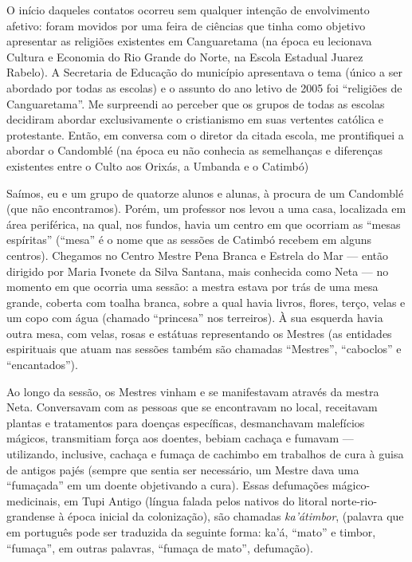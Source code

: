 \begin{refsection}
    O início daqueles contatos ocorreu sem qualquer intenção de envolvimento afetivo: foram movidos por uma feira de ciências que tinha como objetivo apresentar as religiões existentes em Canguaretama (na época eu lecionava Cultura e Economia do Rio Grande do Norte, na Escola Estadual Juarez Rabelo). A Secretaria de Educação do município apresentava o tema (único a ser abordado por todas as escolas) e o assunto do ano letivo de 2005 foi ``religiões de Canguaretama''. Me surpreendi ao perceber que os grupos de todas as escolas decidiram abordar exclusivamente o cristianismo em suas vertentes católica e protestante. Então, em conversa com o diretor da citada escola, me prontifiquei a abordar o Candomblé (na época eu não conhecia as semelhanças e diferenças existentes entre o Culto aos Orixás, a Umbanda e o Catimbó) 

    Saímos, eu e um grupo de quatorze alunos e alunas, à procura de um Candomblé (que não encontramos). Porém, um professor nos levou a uma casa, localizada em área periférica, na qual, nos fundos, havia um centro em que ocorriam as ``mesas espíritas'' (``mesa'' é o nome que as sessões de Catimbó recebem em alguns centros). Chegamos no Centro Mestre Pena Branca e Estrela do Mar --- então dirigido por Maria Ivonete da Silva Santana, mais conhecida como Neta --- no momento em que ocorria uma sessão: a mestra estava por trás de uma mesa grande, coberta com toalha branca, sobre a qual havia livros, flores, terço, velas e um copo com água (chamado ``princesa'' nos terreiros). À sua esquerda havia outra mesa, com velas, rosas e estátuas representando os Mestres (as entidades espirituais que atuam nas sessões também são chamadas ``Mestres'', ``caboclos'' e ``encantados''). 

    Ao longo da sessão, os Mestres vinham e se manifestavam através da mestra Neta. Conversavam com as pessoas que se encontravam no local, receitavam plantas e tratamentos para doenças específicas, desmanchavam malefícios mágicos, transmitiam força aos doentes, bebiam cachaça e fumavam --- utilizando, inclusive, cachaça e fumaça de cachimbo em trabalhos de cura à guisa de antigos pajés (sempre que sentia ser necessário, um Mestre dava uma ``fumaçada'' em um doente objetivando a cura). Essas defumações mágico-medicinais, em Tupi Antigo (língua falada pelos nativos do litoral norte-rio-grandense à época inicial da colonização), são chamadas \textit{ka'átimbor}, (palavra que em português pode ser traduzida da seguinte forma: ka'á, ``mato'' e timbor, ``fumaça'', em outras palavras, ``fumaça de mato'', defumação). 


\end{refsection}
